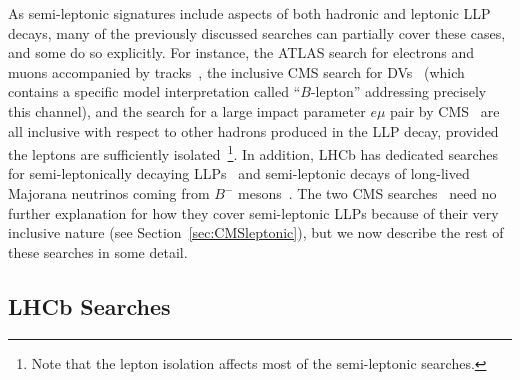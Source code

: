 As semi-leptonic signatures include aspects of both hadronic and leptonic LLP decays, many of the previously discussed searches can partially cover these cases, and some do so explicitly. For instance, the ATLAS search for electrons and muons accompanied by tracks~\cite{Aad:2015rba}, the inclusive CMS search for DVs~\cite{Sirunyan:2017jdo} (which contains a specific model interpretation called ``$B$-lepton'' addressing precisely this channel), and the search for a large impact parameter $e\mu$ pair by CMS~\cite{CMS-PAS-EXO-16-022} are all inclusive with respect to other hadrons produced in the LLP decay, provided the leptons are sufficiently isolated~\footnote{Note that the lepton isolation affects most of the semi-leptonic searches.}. In addition, LHCb has dedicated searches for semi-leptonically decaying LLPs~\cite{Aaij:2016xmb} and semi-leptonic decays of long-lived Majorana neutrinos coming from $B^{-}$ mesons~\cite{Aaij:2014aba}. The two CMS searches~\cite{Sirunyan:2017jdo,CMS-PAS-EXO-16-022} need no further explanation for how they cover semi-leptonic LLPs because of their very inclusive nature (see Section~\ref{sec:CMSleptonic}), but we now describe the rest of these searches in some detail.

\subsection{LHCb Searches}

